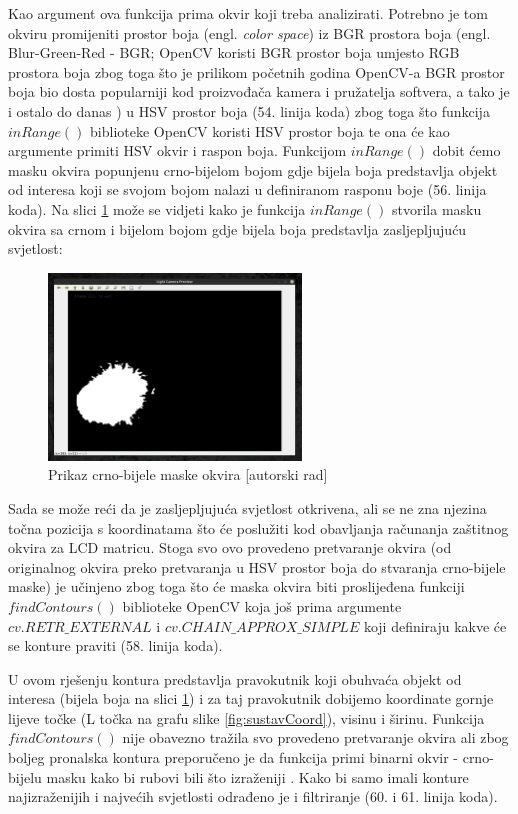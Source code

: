 \documentclass{foi}
\begin{document}
Kao argument ova funkcija prima okvir koji treba analizirati. Potrebno je tom okviru promijeniti prostor boja (engl. \emph{color space}) iz BGR prostora boja (engl. Blur-Green-Red - BGR; OpenCV koristi BGR prostor boja umjesto RGB prostora boja zbog toga što je prilikom početnih godina OpenCV-a BGR prostor boja bio dosta popularniji kod proizvođača kamera i pružatelja softvera, a tako je i ostalo do danas \cite{Satya}) u HSV prostor boja (54. linija koda) zbog toga što funkcija $inRange()$ biblioteke OpenCV koristi HSV prostor boja te ona će kao argumente primiti HSV okvir i raspon boja. Funkcijom $inRange()$ dobit ćemo masku okvira popunjenu crno-bijelom bojom gdje bijela boja predstavlja objekt od interesa koji se svojom bojom nalazi u definiranom rasponu boje \cite{OpenCV3} (56. linija koda). Na slici \ref{fig:maska} može se vidjeti kako je funkcija $inRange()$ stvorila masku okvira sa crnom i bijelom bojom gdje bijela boja predstavlja zasljepljujuću svjetlost:

\begin{figure}[h!]
    \centering
    \includegraphics[width=0.6\textwidth]{slike/cb_maska_okvir}
    \caption{Prikaz crno-bijele maske okvira [autorski rad]}
    \label{fig:maska}
\end{figure}

Sada se može reći da je zasljepljujuća svjetlost otkrivena, ali se ne zna njezina točna pozicija s koordinatama što će poslužiti kod obavljanja računanja zaštitnog okvira za LCD matricu. Stoga svo ovo provedeno pretvaranje okvira (od originalnog okvira preko pretvaranja u HSV prostor boja do stvaranja crno-bijele maske) je učinjeno zbog toga što će maska okvira biti proslijeđena funkciji $findContours()$ biblioteke OpenCV koja još prima argumente $cv.RETR\_EXTERNAL$ i $cv.CHAIN\_APPROX\_SIMPLE$ koji definiraju kakve će se konture praviti (58. linija koda).

\newpage
U ovom rješenju kontura predstavlja pravokutnik koji obuhvaća objekt od interesa (bijela boja na slici \ref{fig:maska}) i za taj pravokutnik dobijemo koordinate gornje lijeve točke (L točka na grafu slike \ref{fig:sustavCoord}), visinu i širinu. Funkcija $findContours()$ nije obavezno tražila svo provedeno pretvaranje okvira ali zbog boljeg pronalska kontura preporučeno je da funkcija primi binarni okvir - crno-bijelu masku kako bi rubovi bili što izraženiji \cite{OpenCV4}. Kako bi samo imali konture najizraženijih i najvećih svjetlosti odrađeno je i filtriranje (60. i 61. linija koda).
\end{document}
